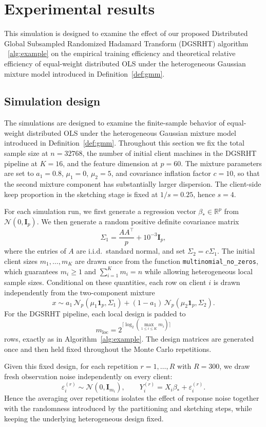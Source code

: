 \documentclass[11pt,a4paper]{article}
\begin{document}
\section{Experimental results}
This simulation is designed to examine the effect of our proposed Distributed Global Subsampled Randomized Hadamard Transform (DGSRHT) algorithm ~\ref{alg:example} on the empirical training efficiency and theoretical relative efficiency of equal-weight distributed OLS under the heterogeneous Gaussian mixture model introduced in Definition~\ref{def:gmm}.
\subsection{Simulation design}

The simulations are designed to examine the finite-sample behavior of equal-weight distributed OLS under the heterogeneous Gaussian mixture model introduced in Definition~\ref{def:gmm}. Throughout this section we fix the total sample size at $n=32768$, the number of initial client machines in the DGSRHT pipeline at $K=16$, and the feature dimension at $p=60$. The mixture parameters are set to $a_{1}=0.8$, $\mu_{1}=0$, $\mu_{2}=5$, and covariance inflation factor $c=10$, so that the second mixture component has substantially larger dispersion. The client-side keep proportion in the sketching stage is fixed at $1/s=0.25$, hence $s=4$.

For each simulation run, we first generate a regression vector $\beta_{\ast}\in\mathbb{R}^{p}$ from $\mathcal{N}(0,\mathbf{I}_{p})$. We then generate a random positive definite covariance matrix
\[
\Sigma_{1}=\frac{AA^{\top}}{p}+10^{-3}\mathbf{I}_{p},
\]
where the entries of $A$ are i.i.d.\ standard normal, and set $\Sigma_{2}=c\Sigma_{1}$. The initial client sizes $m_{1},\ldots,m_{K}$ are drawn once from the function \texttt{multinomial\_no\_zeros}, which guarantees $m_{i}\geq 1$ and $\sum_{i=1}^{K} m_{i}=n$ while allowing heterogeneous local sample sizes. Conditional on these quantities, each row on client $i$ is drawn independently from the two-component mixture
\[
x \sim a_{1}\,\mathcal{N}_{p}(\mu_{1}\mathbf{1}_{p},\Sigma_{1}) + (1-a_{1})\,\mathcal{N}_{p}(\mu_{2}\mathbf{1}_{p},\Sigma_{2}).
\]
For the DGSRHT pipeline, each local design is padded to
\[
m_{\mathrm{loc}} = 2^{\lceil \log_{2}(\max_{1\leq i\leq K} m_{i}) \rceil}
\]
rows, exactly as in Algorithm~\ref{alg:example}. The design matrices are generated once and then held fixed throughout the Monte Carlo repetitions.

Given this fixed design, for each repetition $r=1,\ldots,R$ with $R=300$, we draw fresh observation noise independently on every client:
\[
\varepsilon_{i}^{(r)} \sim \mathcal{N}(0,\mathbf{I}_{m_{i}}), \qquad
Y_{i}^{(r)} = X_{i}\beta_{\ast} + \varepsilon_{i}^{(r)}.
\]
Hence the averaging over repetitions isolates the effect of response noise together with the randomness introduced by the partitioning and sketching steps, while keeping the underlying heterogeneous design fixed.
\end{document}
